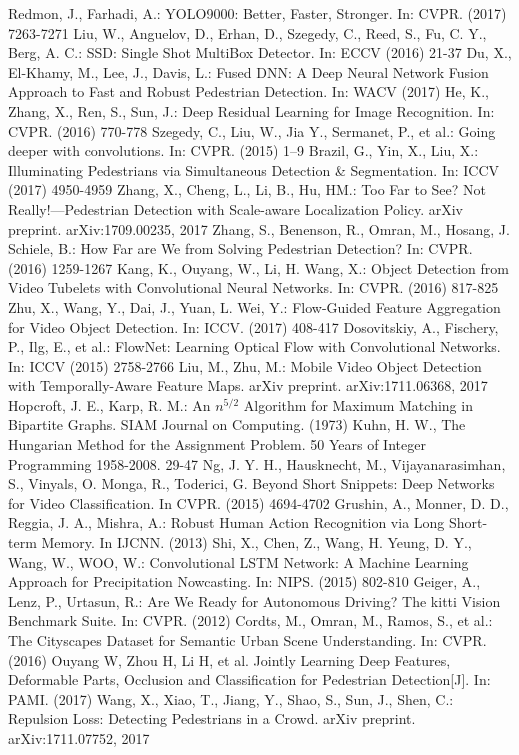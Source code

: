 \documentclass[runningheads]{llncs}
\begin{document}
\begin{thebibliography}{50}
	Redmon, J., Farhadi, A.: YOLO9000: Better, Faster, Stronger. In: CVPR. (2017) 7263-7271
    Liu, W., Anguelov, D., Erhan, D., Szegedy, C., Reed, S., Fu, C. Y., Berg, A. C.: SSD: Single Shot MultiBox Detector. In: ECCV (2016) 21-37	
 	Du, X., El-Khamy, M., Lee, J., Davis, L.: Fused DNN: A Deep Neural Network Fusion Approach to Fast and Robust Pedestrian Detection. In: WACV (2017)
 	He, K., Zhang, X., Ren, S., Sun, J.: Deep Residual Learning for Image Recognition. In: CVPR. (2016) 770-778   
	Szegedy, C., Liu, W., Jia Y., Sermanet, P., et al.: Going deeper with convolutions. In: CVPR. (2015) 1–9
	Brazil, G., Yin, X., Liu, X.: Illuminating Pedestrians via Simultaneous Detection \& Segmentation. In: ICCV (2017) 4950-4959
	Zhang, X., Cheng, L., Li, B., Hu, HM.: Too Far to See? Not Really!---Pedestrian Detection with Scale-aware Localization Policy. arXiv preprint. arXiv:1709.00235, 2017	
	Zhang, S., Benenson, R., Omran, M., Hosang, J. Schiele, B.: How Far are We from Solving Pedestrian Detection? In: CVPR. (2016) 1259-1267
	Kang, K., Ouyang, W., Li, H. Wang, X.: Object Detection from Video Tubelets with Convolutional Neural Networks. In: CVPR. (2016) 817-825
	Zhu, X., Wang, Y., Dai, J., Yuan, L. Wei, Y.: Flow-Guided Feature Aggregation for Video Object Detection. In: ICCV. (2017) 408-417 		
	Dosovitskiy, A., Fischery, P., Ilg, E., et al.: FlowNet: Learning Optical Flow with Convolutional Networks. In: ICCV (2015) 2758-2766
	Liu, M., Zhu, M.: Mobile Video Object Detection with Temporally-Aware Feature Maps. arXiv preprint. arXiv:1711.06368, 2017 		
	Hopcroft, J. E., Karp, R. M.: An $n^{5/2}$ Algorithm for Maximum Matching in Bipartite Graphs. SIAM Journal on Computing. (1973) 
	Kuhn, H. W., The Hungarian Method for the Assignment Problem. 50 Years of Integer Programming 1958-2008. 29-47
	Ng, J. Y. H., Hausknecht, M., Vijayanarasimhan, S., Vinyals, O. Monga, R., Toderici, G. Beyond Short Snippets: Deep Networks for Video Classification. In CVPR. (2015) 4694-4702				
	Grushin, A., Monner, D. D., Reggia, J. A., Mishra, A.: Robust Human Action Recognition via Long Short-term Memory. In IJCNN. (2013) 
	 Shi, X., Chen, Z., Wang, H. Yeung, D. Y., Wang, W., WOO, W.: Convolutional LSTM Network: A Machine Learning Approach for Precipitation Nowcasting. In: NIPS. (2015) 802-810			
	Geiger, A., Lenz, P., Urtasun, R.: Are We Ready for Autonomous Driving? The kitti Vision Benchmark Suite. In: CVPR. (2012)
	Cordts, M., Omran, M., Ramos, S., et al.: The Cityscapes Dataset for Semantic Urban Scene Understanding. In: CVPR. (2016)
	Ouyang W, Zhou H, Li H, et al. Jointly Learning Deep Features, Deformable Parts, Occlusion and Classification for Pedestrian Detection[J]. In: PAMI. (2017) 
	Wang, X., Xiao, T., Jiang, Y., Shao, S., Sun, J., Shen, C.: Repulsion Loss: Detecting Pedestrians in a Crowd. arXiv preprint. arXiv:1711.07752, 2017
\end{thebibliography} 


%
\end{document}
